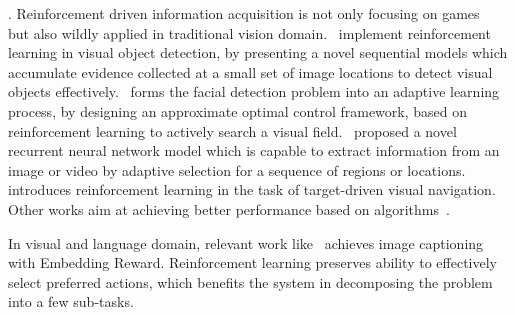 . Reinforcement driven information acquisition is not only focusing on games~\cite{NIPS2017_7084,NIPS2002_2171,NIPS2017_7007} but also wildly applied in traditional vision domain.~\cite{DBLP:conf/cvpr/MathePS16} implement reinforcement learning in visual object detection, by presenting a novel sequential
models which accumulate evidence collected at a small set of
image locations to detect visual objects effectively.~\cite{DBLP:conf/cvpr/GoodrichA12} forms the facial detection problem into an adaptive learning process, by designing an approximate optimal control framework, based on reinforcement learning to actively search a visual field.~\cite{DBLP:conf/nips/MnihHGK14} proposed a novel recurrent neural network model which is capable to extract information from an image or video by adaptive selection for a sequence of regions or locations.~\cite{zhu2017icra} introduces reinforcement learning in the task of target-driven visual navigation. Other works aim at achieving better performance based on algorithms~\cite{5596468,DBLP:conf/aaai/AbtahiF11}.

In visual and language domain, relevant work like~\cite{DBLP:conf/cvpr/RenWZLL17} achieves image captioning with Embedding Reward. Reinforcement learning preserves ability to effectively select preferred actions, which benefits the system in decomposing the problem into a few sub-tasks.




